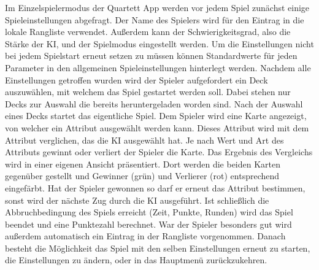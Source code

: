 \documentclass{scrartcl}
\begin{document}
\noindent
Im Einzelspielermodus der Quartett App werden vor jedem Spiel zunächst einige
Spieleinstellungen abgefragt. Der Name des Spielers wird für den Eintrag in die
lokale Rangliste verwendet. Außerdem kann der Schwierigkeitsgrad, also die
Stärke der KI, und der Spielmodus eingestellt werden. Um die Einstellungen nicht
bei jedem Spielstart erneut setzen zu müssen können Standardwerte für jeden
Parameter in den allgemeinen Spieleinstellungen hinterlegt werden. Nachdem alle
Einstellungen getroffen wurden wird der Spieler aufgefordert ein Deck
auszuwählen, mit welchem das Spiel gestartet werden soll. Dabei stehen nur Decks
zur Auswahl die bereits heruntergeladen worden sind. Nach der Auswahl eines
Decks startet das eigentliche Spiel. Dem Spieler wird eine Karte angezeigt, von
welcher ein Attribut ausgewählt werden kann. Dieses Attribut wird mit dem
Attribut verglichen, das die KI ausgewählt hat. Je nach Wert und Art des
Attributs gewinnt oder verliert der Spieler die Karte. Das Ergebnis des
Vergleichs wird in einer eigenen Ansicht präsentiert. Dort werden die beiden
Karten gegenüber gestellt und Gewinner (grün) und Verlierer (rot) entsprechend
eingefärbt. Hat der Spieler gewonnen so darf er erneut das Attribut bestimmen,
sonst wird der nächste Zug durch die KI ausgeführt. Ist schließlich die
Abbruchbedingung des Spiels erreicht (Zeit, Punkte, Runden) wird das Spiel
beendet und eine Punktezahl berechnet. War der Spieler besonders gut wird
außerdem automatisch ein Eintrag in der Rangliste vorgenommen. Danach besteht
die Möglichkeit das Spiel mit den selben Einstellungen erneut zu starten, die
Einstellungen zu ändern, oder in das Hauptmenü zurückzukehren.
\end{document}
